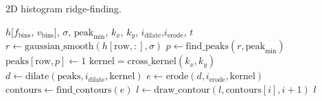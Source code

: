
\begin{algorithm}
    \caption{2D histogram ridge-finding.}
    \label{alg:material}
    \begin{algorithmic}
         {$h[f_\text{bins}$, $v_\text{bins}]$, $\sigma$, $\text{peak}_\text{min}$, $k_x$, $k_y$, \newline \indent \indent $i_\text{dilate}$,$i_\text{erode}$, $t$}
                \State $r \gets \text{gaussian\_smooth}(h[\text{row},:], \sigma)$
                \State $p \gets \text{find\_peaks}(r, \text{peak}_\text{min})$
                \State $\text{peaks}[\text{row}, p] \gets 1$
            \EndFor
            \State $\text{kernel} = \text{cross\_kernel}(k_x, k_y)$
            \State $d \gets \text{dilate}(\text{peaks}, i_{\text{dilate}}, \text{kernel})$
            \State $e \gets \text{erode}(d, i_{\text{erode}}, \text{kernel})$
            \State $\text{contours} \gets \text{find\_contours}(e)$
                    \State $l \gets \text{draw\_contour}(l, \text{contours}[i], i+1)$
                \EndIf
            \EndFor
            \State \Return $l$
        \EndFunction
    \end{algorithmic}
\end{algorithm}

